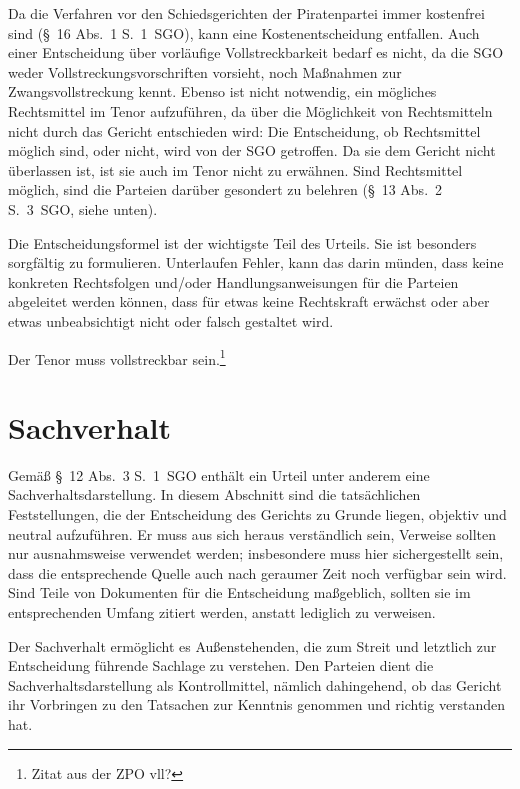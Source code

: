 Da die Verfahren vor den Schiedsgerichten der Piratenpartei immer kostenfrei sind (\S~16 Abs.~1 S.~1~SGO), kann eine Kostenentscheidung entfallen. Auch einer Entscheidung über vorläufige Vollstreckbarkeit bedarf es nicht, da die SGO weder Vollstreckungsvorschriften vorsieht, noch Maßnahmen zur Zwangsvollstreckung kennt. Ebenso ist nicht notwendig, ein mögliches Rechtsmittel im Tenor aufzuführen, da über die Möglichkeit von Rechtsmitteln nicht durch das Gericht entschieden wird: Die Entscheidung, ob Rechtsmittel möglich sind, oder nicht, wird von der SGO getroffen. Da sie dem Gericht nicht überlassen ist, ist sie auch im Tenor nicht zu erwähnen. Sind Rechtsmittel möglich, sind die Parteien darüber gesondert zu belehren (\S~13 Abs.~2 S.~3~SGO, siehe unten).

Die Entscheidungsformel ist der wichtigste Teil des Urteils. Sie ist besonders sorgfältig zu formulieren. Unterlaufen Fehler, kann das darin münden, dass keine konkreten Rechtsfolgen und/oder Handlungsanweisungen für die Parteien abgeleitet werden können, dass für etwas keine Rechtskraft erwächst oder aber etwas unbeabsichtigt nicht oder falsch gestaltet wird.

Der Tenor muss vollstreckbar sein.\footnote{Zitat aus der ZPO vll?}

\section{Sachverhalt}
Gemäß \S~12 Abs.~3 S.~1~SGO enthält ein Urteil unter anderem eine Sachverhaltsdarstellung. In diesem Abschnitt sind die tatsächlichen Feststellungen, die der Entscheidung des Gerichts zu Grunde liegen, objektiv und neutral aufzuführen. Er muss aus sich heraus verständlich sein, Verweise sollten nur ausnahmsweise verwendet werden; insbesondere muss hier sichergestellt sein, dass die entsprechende Quelle auch nach geraumer Zeit noch verfügbar sein wird. Sind Teile von Dokumenten für die Entscheidung maßgeblich, sollten sie im entsprechenden Umfang zitiert werden, anstatt lediglich zu verweisen.

Der Sachverhalt ermöglicht es Außenstehenden, die zum Streit und letztlich zur Entscheidung führende Sachlage zu verstehen. Den Parteien dient die Sachverhaltsdarstellung als Kontrollmittel, nämlich dahingehend, ob das Gericht ihr Vorbringen zu den Tatsachen zur Kenntnis genommen und richtig verstanden hat.

